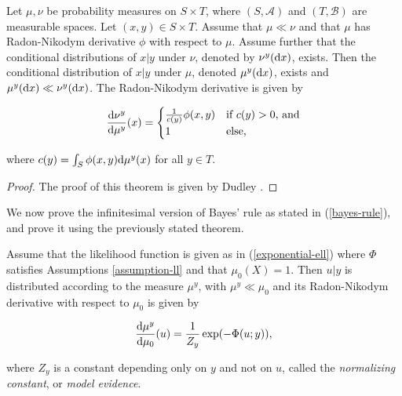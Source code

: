 \begin{theorem}
  \label{duley}
  Let $\mu, \nu$ be probability measures on $S \times T$, where $(S, \mathcal{A})$ and $(T, \mathcal{B})$ are measurable spaces. Let $(x, y) \in S \times T$. Assume that $\mu \ll \nu$ and that $\mu$ has Radon-Nikodym derivative $\phi$ with respect to $\mu$. Assume further that the conditional distributions of $x|y$ under $\nu$, denoted by $\nu^y(\text{d} x)$, exists. Then the conditional distribution of $x|y$ under $\mu$, denoted $\mu^y(\text{d} x)$, exists and $\mu^y(\text{d} x) \ll \nu^y(\text{d} x)$. The Radon-Nikodym derivative is given by

  \begin{equation}
    \frac{\text{d} \nu^y}{\text{d} \mu^y}(x) =  \begin{cases}
      \frac1{c(y)}\phi(x,y) & \text{if $c(y) > 0$, and}\\
      1 & \text{else,}
    \end{cases}  
  \end{equation}

  where $c(y) = \int_{S}\phi(x,y)\text{d} \mu^y(x)$ for all $y \in T$.
\end{theorem}

\begin{proof}
  The proof of this theorem is given by Dudley \cite{dudley_2002}.
\end{proof}

We now prove the infinitesimal version of Bayes' rule as stated in (\ref{bayes-rule}), and prove it using the previously stated theorem.

\begin{theorem}
  Assume that the likelihood function is given as in (\ref{exponential-ell}) where $\Phi$ satisfies Assumptions \ref{assumption-ll} and that $\mu_0(X) = 1$. Then $u | y$ is distributed according to the measure $\mu^y$, with $\mu^y \ll \mu_0$ and its Radon-Nikodym derivative with respect to $\mu_0$ is given by

  \begin{equation}
    \frac{\text{d} \mu^y}{\text{d} \mu_0}(u) = \frac1{Z_y}\exp(-\Phi(u;y)),
  \end{equation}

  where $Z_y$ is a constant depending only on $y$ and not on $u$, called the \textit{normalizing constant}, or \textit{model evidence}.
\end{theorem}

